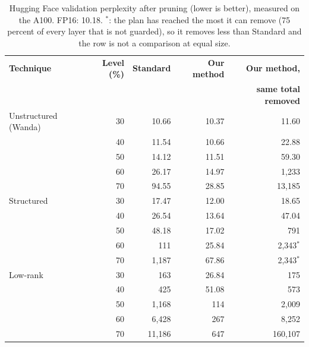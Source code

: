 \documentclass[
11pt, %
english, %
singlespacing, %
headsepline, %
]{MastersDoctoralThesis} %
\begin{document}
\begin{table}[htbp]
\centering
\small
\caption{Hugging Face validation perplexity after pruning (lower is better), measured on the A100. FP16: 10.18. $^{*}$: the plan has reached the most it can remove (75 percent of every layer that is not guarded), so it removes less than Standard and the row is not a comparison at equal size.}
\label{tab:ch5-prune}
\renewcommand{\arraystretch}{1.1}
\begin{tabularx}{0.9\textwidth}{Xrrrr}
\hline
\textbf{Technique} & \textbf{Level (\%)} & \textbf{Standard} & \textbf{Our method} & \textbf{Our method,} \\
 & & & & \textbf{same total removed} \\
\hline
Unstructured (Wanda) & 30 & 10.66 & 10.37 & 11.60 \\
 & 40 & 11.54 & 10.66 & 22.88 \\
 & 50 & 14.12 & 11.51 & 59.30 \\
 & 60 & 26.17 & 14.97 & 1{,}233 \\
 & 70 & 94.55 & 28.85 & 13{,}185 \\
\hline
Structured & 30 & 17.47 & 12.00 & 18.65 \\
 & 40 & 26.54 & 13.64 & 47.04 \\
 & 50 & 48.18 & 17.02 & 791 \\
 & 60 & 111 & 25.84 & 2{,}343$^{*}$ \\
 & 70 & 1{,}187 & 67.86 & 2{,}343$^{*}$ \\
\hline
Low-rank & 30 & 163 & 26.84 & 175 \\
 & 40 & 425 & 51.08 & 573 \\
 & 50 & 1{,}168 & 114 & 2{,}009 \\
 & 60 & 6{,}428 & 267 & 8{,}252 \\
 & 70 & 11{,}186 & 647 & 160{,}107 \\
\hline
\end{tabularx}
\end{table}
\end{document}
